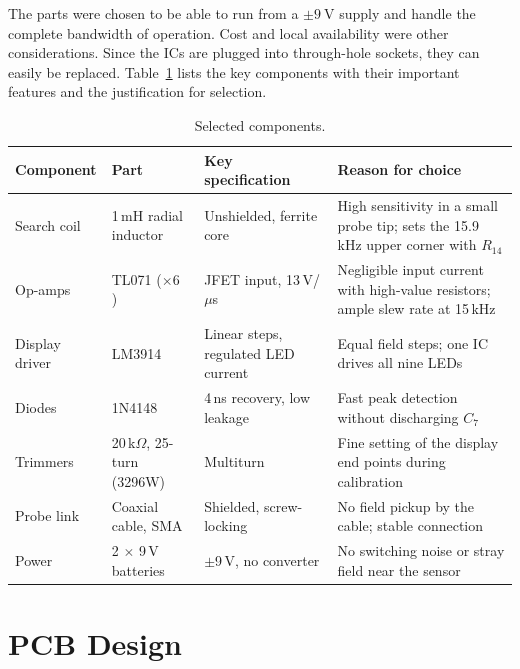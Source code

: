 \documentclass[11pt,a4paper]{article}
\begin{document}
The parts were chosen to be able to run from a $\pm\SI{9}{\volt}$ supply and handle the complete bandwidth of operation. Cost and local availability were other considerations. Since the ICs are plugged into through-hole sockets, they can easily be replaced. Table~\ref{tab:components} lists the key components with their important features and the justification for selection.

\begin{table}[htbp]
  \centering
  \caption{Selected components.}
  \label{tab:components}
  \small
  \begin{tabularx}{\textwidth}{@{}l l l >{\raggedright\arraybackslash}X@{}}
    \toprule
    \textbf{Component} & \textbf{Part} & \textbf{Key specification} & \textbf{Reason for choice} \\
    \midrule
    Search coil & 1\,mH radial inductor & Unshielded, ferrite core & High sensitivity in a small probe tip; sets the 15.9\,kHz upper corner with $R_{14}$ \\
    Op-amps & TL071 ($\times 6$)~\cite{ti_tl07x} & JFET input, 13\,V/$\mu$s & Negligible input current with high-value resistors; ample slew rate at 15\,kHz \\
    Display driver & LM3914~\cite{ti_lm3914} & Linear steps, regulated LED current & Equal field steps; one IC drives all nine LEDs \\
    Diodes & 1N4148~\cite{vishay_1n4148} & 4\,ns recovery, low leakage & Fast peak detection without discharging $C_7$ \\
    Trimmers & 20\,k$\Omega$, 25-turn (3296W) & Multiturn & Fine setting of the display end points during calibration \\
    Probe link & Coaxial cable, SMA & Shielded, screw-locking & No field pickup by the cable; stable connection \\
    Power & 2 $\times$ 9\,V batteries & $\pm$9\,V, no converter & No switching noise or stray field near the sensor \\
    \bottomrule
  \end{tabularx}
\end{table}

\newpage

\section{PCB Design}
\label{sec:pcb}
\end{document}
